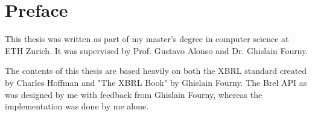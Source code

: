 \section{Preface}

This thesis was written as part of my master's degree in computer science at ETH Zurich.
It was supervised by Prof. Gustavo Alonso and Dr. Ghislain Fourny.


The contents of this thesis are based heavily on both the XBRL standard\cite{xbrl} created by Charles Hoffman and "The XBRL Book"\cite{fourny2023xbrl} by Ghislain Fourny.
The Brel API as was designed by me with feedback from Ghislain Fourny,
whereas the implementation was done by me alone.